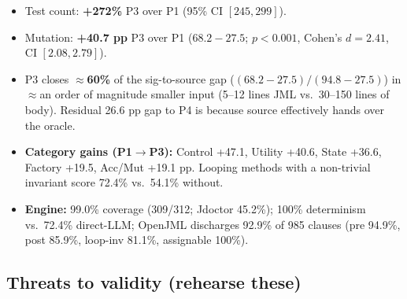 \documentclass[11pt]{article}
\begin{document}
\begin{itemize}[leftmargin=1.4em,itemsep=0.05em]
  \item Test count: \textbf{+272\%} P3 over P1 (95\% CI $[245,299]$).
  \item Mutation: \textbf{+40.7 pp} P3 over P1 ($68.2-27.5$; $p<0.001$,
        Cohen's $d=2.41$, CI $[2.08,2.79]$).
  \item P3 closes $\approx$\textbf{60\%} of the sig-to-source gap
        ($(68.2-27.5)/(94.8-27.5)$) in $\approx$an order of magnitude smaller
        input (5--12 lines JML vs.\ 30--150 lines of body). Residual 26.6 pp
        gap to P4 is because source effectively hands over the oracle.
  \item \textbf{Category gains (P1$\to$P3):} Control +47.1, Utility +40.6,
        State +36.6, Factory +19.5, Acc/Mut +19.1 pp. Looping methods with a
        non-trivial invariant score 72.4\% vs.\ 54.1\% without.
  \item \textbf{Engine:} 99.0\% coverage (309/312; Jdoctor 45.2\%); 100\%
        determinism vs.\ 72.4\% direct-LLM; OpenJML discharges 92.9\% of 985
        clauses (pre 94.9\%, post 85.9\%, loop-inv 81.1\%, assignable 100\%).
\end{itemize}

\subsection{Threats to validity (rehearse these)}
\end{document}
